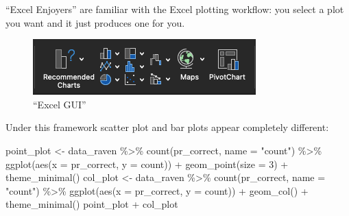\documentclass[
  letterpaper,
]{book}
\newenvironment{Shaded}{\begin{snugshade}}{\end{snugshade}}
\newcommand{\AttributeTok}[1]{\textcolor[rgb]{0.40,0.45,0.13}{#1}}
\newcommand{\DecValTok}[1]{\textcolor[rgb]{0.68,0.00,0.00}{#1}}
\newcommand{\FunctionTok}[1]{\textcolor[rgb]{0.28,0.35,0.67}{#1}}
\newcommand{\NormalTok}[1]{\textcolor[rgb]{0.00,0.23,0.31}{#1}}
\newcommand{\OtherTok}[1]{\textcolor[rgb]{0.00,0.23,0.31}{#1}}
\newcommand{\SpecialCharTok}[1]{\textcolor[rgb]{0.37,0.37,0.37}{#1}}
\newcommand{\StringTok}[1]{\textcolor[rgb]{0.13,0.47,0.30}{#1}}
\begin{document}
``Excel Enjoyers'' are familiar with the Excel plotting workflow: you
select a plot you want and it just produces one for you.

\begin{figure}

{\centering \includegraphics{./images/Excel_Plotting.png}

}

\caption{``Excel GUI''}

\end{figure}

Under this framework scatter plot and bar plots appear completely
different:

\begin{Shaded}
\begin{Highlighting}[]
\NormalTok{point\_plot }\OtherTok{\textless{}{-}}\NormalTok{ data\_raven }\SpecialCharTok{\%\textgreater{}\%} \FunctionTok{count}\NormalTok{(pr\_correct, }\AttributeTok{name =} \StringTok{"count"}\NormalTok{) }\SpecialCharTok{\%\textgreater{}\%} \FunctionTok{ggplot}\NormalTok{(}\FunctionTok{aes}\NormalTok{(}\AttributeTok{x =}\NormalTok{ pr\_correct, }\AttributeTok{y =}\NormalTok{ count)) }\SpecialCharTok{+} \FunctionTok{geom\_point}\NormalTok{(}\AttributeTok{size =} \DecValTok{3}\NormalTok{) }\SpecialCharTok{+} \FunctionTok{theme\_minimal}\NormalTok{()}
\NormalTok{col\_plot }\OtherTok{\textless{}{-}}\NormalTok{ data\_raven }\SpecialCharTok{\%\textgreater{}\%} \FunctionTok{count}\NormalTok{(pr\_correct, }\AttributeTok{name =} \StringTok{"count"}\NormalTok{) }\SpecialCharTok{\%\textgreater{}\%} \FunctionTok{ggplot}\NormalTok{(}\FunctionTok{aes}\NormalTok{(}\AttributeTok{x =}\NormalTok{ pr\_correct, }\AttributeTok{y =}\NormalTok{ count)) }\SpecialCharTok{+} \FunctionTok{geom\_col}\NormalTok{() }\SpecialCharTok{+} \FunctionTok{theme\_minimal}\NormalTok{()}
\NormalTok{point\_plot }\SpecialCharTok{+}\NormalTok{ col\_plot}
\end{Highlighting}
\end{Shaded}
\end{document}

